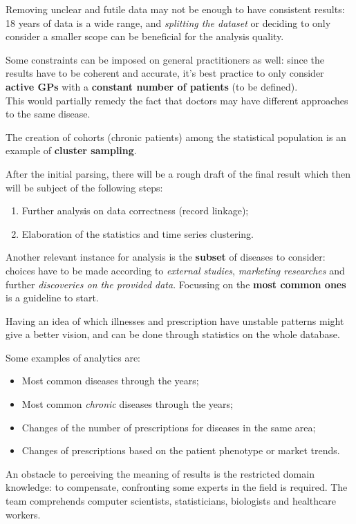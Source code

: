 Removing unclear and futile data may not be enough to have consistent results: 18 years of data is a wide range, and \textit{splitting the dataset} or deciding to only consider a smaller scope can be beneficial for the analysis quality. 

Some constraints can be imposed on general practitioners as well: since the results have to be coherent and accurate, it's best practice to only consider \textbf{active GPs} with a \textbf{constant number of patients} (to be defined). \\ This would partially remedy the fact that doctors may have different approaches to the same disease.

The creation of cohorts (chronic patients) among the statistical population is an example of \textbf{cluster sampling}.

After the initial parsing, there will be a rough draft of the final result which then will be subject of the following steps:
\begin{enumerate}
	\item Further analysis on data correctness (record linkage);
	\item Elaboration of the statistics and time series clustering.
\end{enumerate}

Another relevant instance for analysis is the \textbf{subset} of diseases to consider: choices have to be made according to \textit{external studies}, \textit{marketing researches} and further \textit{discoveries on the provided data}. Focussing on the \textbf{most common ones} is a guideline to start.

Having an idea of which illnesses and prescription have unstable patterns might give a better vision, and can be done through statistics on the whole database. 

Some examples of analytics are:
\begin{itemize}
	\item Most common diseases through the years;
	\item Most common \textit{chronic} diseases through the years;
	\item Changes of the number of prescriptions for diseases in the same area;
	\item Changes of prescriptions based on the patient phenotype or market trends.
\end{itemize}

An obstacle to perceiving the meaning of results is the restricted domain knowledge: to compensate, confronting some experts in the field is required. The team comprehends computer scientists, statisticians, biologists and healthcare workers.

